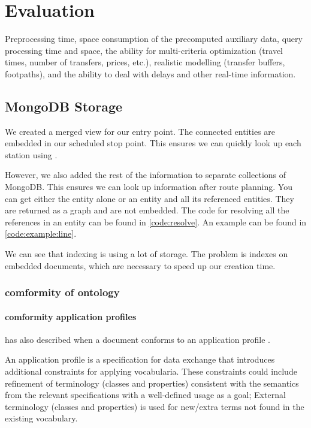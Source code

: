 \chapter{Evaluation}

Preprocessing time, space consumption of the precomputed auxiliary data, query processing time and space, the ability for multi-criteria optimization (travel times, number of transfers, prices, etc.), realistic modelling (transfer buffers, footpaths), and the ability to deal with delays and other real-time information.
\section{MongoDB Storage}
We created a merged view for our entry point. The connected entities are embedded in our scheduled stop point. This ensures we can quickly look up each station using .

However, we also added the rest of the information to separate collections of MongoDB. This ensures we can look up information after route planning. You can get either the entity alone or an entity and all its referenced entities. They are returned as a graph and are not embedded. The code for resolving all the references in an entity can be found in \autoref{code:resolve}. An example can be found in \autoref{code:example:line}.


We can see that indexing is using a lot of storage. The problem is indexes on embedded documents, which are necessary to speed up our creation time.
\subsection{comformity of ontology}
\subsubsection{comformity application profiles}
 has also described when a  document conforms to an application profile \cite{noauthor_conformiteit_nodate}.

An application profile is a specification for data exchange that introduces additional constraints for applying vocabularia. These constraints could include refinement of terminology (classes and properties) consistent with the semantics from the relevant specifications with a well-defined usage as a goal;
    External terminology (classes and properties) is used for new/extra terms not found in the existing vocabulary.

